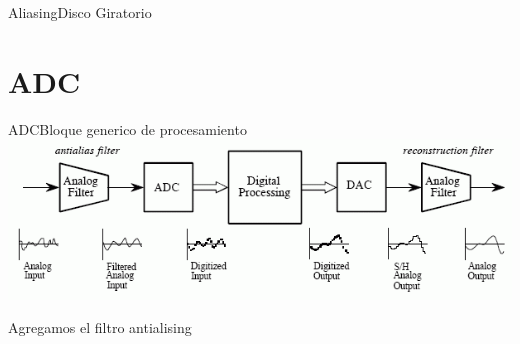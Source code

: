  \begin{frame}{Aliasing}{Disco Giratorio}
    \vfill
 \end{frame}
 \section{ADC}
 \begin{frame}{ADC}{Bloque generico de procesamiento}
    \center\includegraphics[width=1\textwidth]{1_clase/adc_dac2}
    \begin{alertblock} {Agregamos el filtro antialising}
    \end{alertblock}
    \vfill
 \end{frame}
